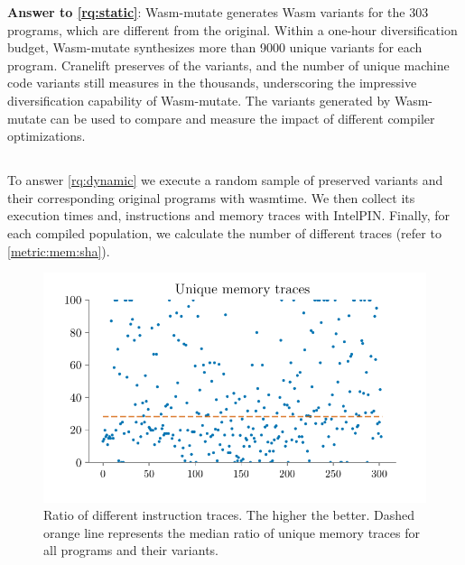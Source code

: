 \documentclass[sigplan,screen]{acmart}
\newcommand{\tool}{Wasm-mutate\xspace}
\newcommand{\wasm}{Wasm\xspace}
\begin{document}




\begin{tcolorbox}[boxrule=1pt,arc=.3em,boxsep=-1.3mm]
  \textbf{Answer to \ref{rq:static}}: \tool generates \wasm variants for the 303 programs, which are different from the original. 
  Within a one-hour diversification budget, \tool synthesizes more than 9000 unique  variants for each program. 
  Cranelift preserves \preserved of the variants, and the number of unique machine code variants still measures in the thousands, underscoring the impressive diversification capability of \tool.
  The variants generated by \tool can be used to compare and measure the impact of different compiler optimizations.
\end{tcolorbox}


\subsection{\rqdynamic}

To answer \ref{rq:dynamic} we execute a random sample of preserved variants and their corresponding original programs with wasmtime.
We then collect its execution times and, instructions and memory traces with IntelPIN.
Finally, for each compiled population, we calculate the number of different traces (refer to \autoref{metric:mem:sha}).

\begin{figure}
    \centering
    \includegraphics[width=\linewidth]{plots/rq2/memory.pdf}
    \caption{Ratio of different instruction traces. The higher the better. Dashed orange line represents the median ratio of unique memory traces for all programs and their variants.}
  \label{rq2:plot:mem}
\end{figure}
\end{document}
